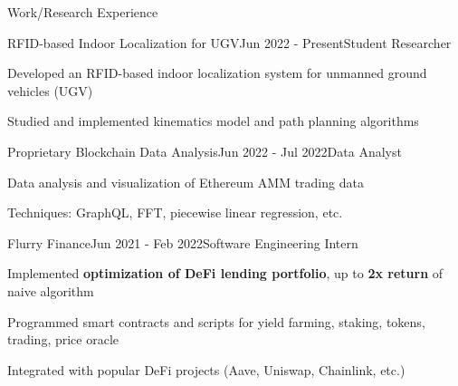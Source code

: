 \documentclass{resume}
\begin{document}
\begin{rSection}{Work/Research Experience}
    
    \begin{rSubsection}{RFID-based Indoor Localization for UGV}{Jun 2022 - Present}{Student Researcher}{}
        \item Developed an RFID-based indoor localization system for unmanned ground vehicles (UGV)
        \item Studied and implemented kinematics model and path planning algorithms
    \end{rSubsection}
    
    \begin{rSubsection}{Proprietary Blockchain Data Analysis}{Jun 2022 - Jul 2022}{Data Analyst}{}
        \item Data analysis and visualization of Ethereum AMM trading data
        \item Techniques: GraphQL, FFT, piecewise linear regression, etc.
    \end{rSubsection}
    
    \begin{rSubsection}{Flurry Finance}{Jun 2021 - Feb 2022}{Software Engineering Intern}{}
        \item Implemented \textbf{optimization of DeFi lending portfolio}, up to \textbf{2x return} of naive algorithm
        \item Programmed smart contracts and scripts for yield farming, staking, tokens, trading, price oracle
        \item Integrated with popular DeFi projects (Aave, Uniswap, Chainlink, etc.)
    \end{rSubsection}
    
\end{rSection}
\end{document}
